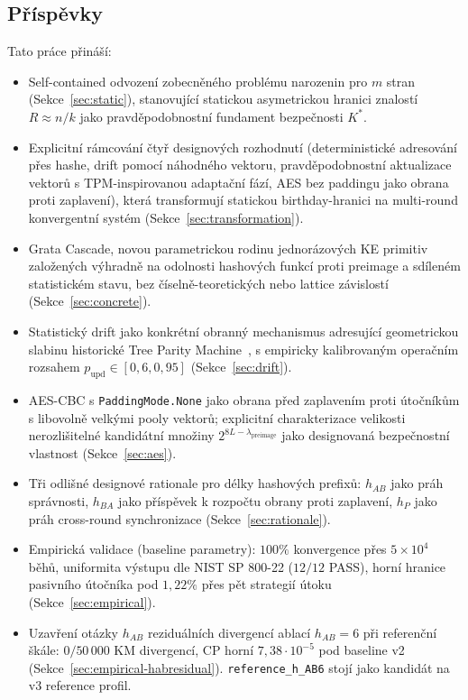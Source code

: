 \documentclass[11pt,a4paper]{article}
\begin{document}
\subsection{Příspěvky}\label{sec:contributions}

Tato práce přináší:
\begin{itemize}[leftmargin=*]
\item Self-contained odvození zobecněného problému narozenin pro $m$ stran (Sekce~\ref{sec:static}), stanovující statickou asymetrickou hranici znalostí $R \approx n/k$ jako pravděpodobnostní fundament bezpečnosti $K^*$.
\item Explicitní rámcování čtyř designových rozhodnutí (deterministické adresování přes hashe, drift pomocí náhodného vektoru, pravděpodobnostní aktualizace vektorů s TPM-inspirovanou adaptační fází, AES bez paddingu jako obrana proti zaplavení), která transformují statickou birthday-hranici na multi-round konvergentní systém (Sekce~\ref{sec:transformation}).
\item Grata Cascade, novou parametrickou rodinu jednorázových KE primitiv založených výhradně na odolnosti hashových funkcí proti preimage a sdíleném statistickém stavu, bez číselně-teoretických nebo lattice závislostí (Sekce~\ref{sec:concrete}).
\item Statistický drift jako konkrétní obranný mechanismus adresující geometrickou slabinu historické Tree Parity Machine~\cite{KMS2003}, s empiricky kalibrovaným operačním rozsahem $p_\text{upd} \in [0{,}6, 0{,}95]$ (Sekce~\ref{sec:drift}).
\item AES-CBC s \texttt{PaddingMode.None} jako obrana před zaplavením proti útočníkům s libovolně velkými pooly vektorů; explicitní charakterizace velikosti nerozlišitelné kandidátní množiny $2^{8L - \lambda_\text{preimage}}$ jako designovaná bezpečnostní vlastnost (Sekce~\ref{sec:aes}).
\item Tři odlišné designové rationale pro délky hashových prefixů: $h_{AB}$ jako práh správnosti, $h_{BA}$ jako příspěvek k rozpočtu obrany proti zaplavení, $h_P$ jako práh cross-round synchronizace (Sekce~\ref{sec:rationale}).
\item Empirická validace (baseline parametry): $100\%$ konvergence přes $5 \times 10^4$ běhů, uniformita výstupu dle NIST SP 800-22 ($12/12$ PASS), horní hranice pasivního útočníka pod $1{,}22\%$ přes pět strategií útoku (Sekce~\ref{sec:empirical}).
\item Uzavření otázky $h_{AB}$ reziduálních divergencí ablací $h_{AB} = 6$ při referenční škále: $0/50\,000$ KM divergencí, CP horní $7{,}38 \cdot 10^{-5}$ pod baseline v2 (Sekce~\ref{sec:empirical-habresidual}). \texttt{reference\_h\_AB6} stojí jako kandidát na v3 reference profil.

\end{itemize}
\end{document}
